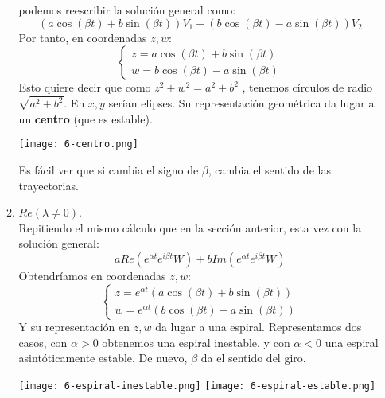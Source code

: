 \begin{enumerate}
\begin{enumerate}
$$        $$
        podemos reescribir la solución general como:
        $$
            (a \cos(\beta t) + b \sin(\beta t))V_1 + (b \cos(\beta t) - a \sin(\beta t))V_2
        $$
        Por tanto, en coordenadas $z, w$:
        $$
            \begin{cases}
                z = a \cos(\beta t) + b \sin(\beta t)\\
                w = b \cos(\beta t) - a \sin(\beta t)
            \end{cases}
        $$
        Esto quiere decir que como $z^2 + w^2 = a^2 + b^2$ , tenemos círculos de radio $\sqrt{a^2+b^2}$. En $x, y$ serían elipses. Su representación geométrica da lugar a un \textbf{centro} (que es estable).
        \begin{center}
            \texttt{[image: 6-centro.png]}
        \end{center}
        Es fácil ver que si cambia el signo de $\beta$, cambia el sentido de las trayectorias.
        \item $Re(\lambda \neq 0)$.\\
        Repitiendo el mismo cálculo que en la sección anterior, esta vez con la solución general:
        $$
            a Re(e^{\alpha t} e^{i\beta t} W) + b Im(e^{\alpha t}e^{i \beta t} W)
        $$
        Obtendríamos en coordenadas $z, w$:
        $$
            \begin{cases}
                z = e^{\alpha t} (a \cos(\beta t) + b \sin(\beta t))\\
                w = e^{\alpha t} (b \cos(\beta t) - a \sin(\beta t))
            \end{cases}
        $$
        Y su representación en $z, w$ da lugar a una espiral. Representamos dos casos, con $\alpha > 0$ obtenemos una espiral inestable, y con $\alpha < 0$ una espiral asintóticamente estable. De nuevo, $\beta$ da el sentido del giro.
        \begin{center}
            \texttt{[image: 6-espiral-inestable.png]}
            \texttt{[image: 6-espiral-estable.png]}
        \end{center}
    \end{enumerate}
\end{enumerate}
